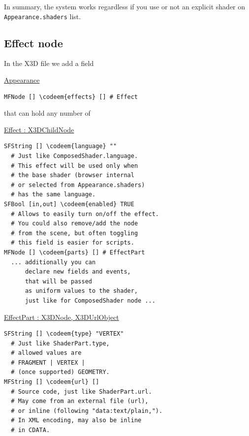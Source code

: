 \documentclass{acmsiggraph}                     %
\newenvironment{mycode}
{\begin{mycodecore}}
{\end{mycodecore}
\vspace{-0.1in}}
\newcommand*{\codeem}[1]{\textbf{#1}}
\begin{document}
In summary, the system works regardless if you use or not an explicit
shader on \texttt{Appearance.shaders} list.

\subsection{Effect node}

In the X3D file we add a field

\begin{mycode}
\underline{Appearance}
\begin{Verbatim}[commandchars=\\\{\}]
MFNode [] \codeem{effects} [] # Effect
\end{Verbatim}
\end{mycode}

that can hold any number of

\begin{mycode}
\underline{Effect : X3DChildNode}
\begin{Verbatim}[commandchars=\\\{\}]
SFString [] \codeem{language} ""
  # Just like ComposedShader.language.
  # This effect will be used only when
  # the base shader (browser internal
  # or selected from Appearance.shaders)
  # has the same language.
SFBool [in,out] \codeem{enabled} TRUE
  # Allows to easily turn on/off the effect.
  # You could also remove/add the node
  # from the scene, but often toggling
  # this field is easier for scripts.
MFNode [] \codeem{parts} [] # EffectPart
  ... additionally you can
      declare new fields and events,
      that will be passed
      as uniform values to the shader,
      just like for ComposedShader node ...
\end{Verbatim}
\end{mycode}

\begin{mycode}
\underline{EffectPart : X3DNode, X3DUrlObject}
\begin{Verbatim}[commandchars=\\\{\}]
SFString [] \codeem{type} "VERTEX"
  # Just like ShaderPart.type,
  # allowed values are
  # FRAGMENT | VERTEX |
  # (once supported) GEOMETRY.
MFString [] \codeem{url} []
  # Source code, just like ShaderPart.url.
  # May come from an external file (url),
  # or inline (following "data:text/plain,").
  # In XML encoding, may also be inline
  # in CDATA.
\end{Verbatim}
\end{mycode}
\end{document}
